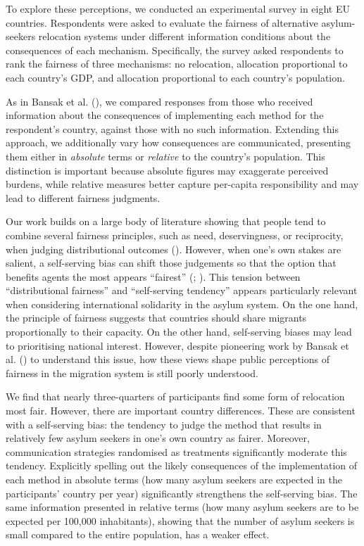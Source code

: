 \documentclass[
  12pt,
  a4paper,
]{article}
\begin{document}
To explore these perceptions, we conducted an experimental survey in eight EU countries. Respondents were asked to evaluate the fairness of alternative asylum-seekers relocation systems under different information conditions about the consequences of each mechanism. Specifically, the survey asked respondents to rank the fairness of three mechanisms: no relocation, allocation proportional to each country's GDP, and allocation proportional to each country's population.

As in Bansak et al. (), we compared responses from those who received information about the consequences of implementing each method for the respondent's country, against those with no such information. Extending this approach, we additionally vary how consequences are communicated, presenting them either in \emph{absolute} terms or \emph{relative} to the country's population. This distinction is important because absolute figures may exaggerate perceived burdens, while relative measures better capture per-capita responsibility and may lead to different fairness judgments.

Our work builds on a large body of literature showing that people tend to combine several fairness principles, such as need, deservingness, or reciprocity, when judging distributional outcomes (). However, when one's own stakes are salient, a self-serving bias can shift those judgements so that the option that benefits agents the most appears ``fairest'' (; ). This tension between ``distributional fairness'' and ``self-serving tendency'' appears particularly relevant when considering international solidarity in the asylum system. On the one hand, the principle of fairness suggests that countries should share migrants proportionally to their capacity. On the other hand, self-serving biases may lead to prioritising national interest. However, despite pioneering work by Bansak et al. () to understand this issue, how these views shape public perceptions of fairness in the migration system is still poorly understood.

We find that nearly three-quarters of participants find some form of relocation most fair. However, there are important country differences. These are consistent with a self-serving bias: the tendency to judge the method that results in relatively few asylum seekers in one's own country as fairer. Moreover, communication strategies randomised as treatments significantly moderate this tendency. Explicitly spelling out the likely consequences of the implementation of each method in absolute terms (how many asylum seekers are expected in the participants' country per year) significantly strengthens the self-serving bias. The same information presented in relative terms (how many asylum seekers are to be expected per 100,000 inhabitants), showing that the number of asylum seekers is small compared to the entire population, has a weaker effect.
\end{document}
